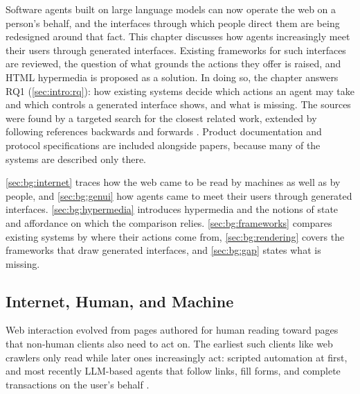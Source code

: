 

Software agents built on large language models can now operate the web on a person's behalf, and the interfaces through which people direct them are being redesigned around that fact.
This chapter discusses how agents increasingly meet their users through generated interfaces.
Existing frameworks for such interfaces are reviewed, the question of what grounds the actions they offer is raised, and HTML hypermedia is proposed as a solution.
In doing so, the chapter answers RQ1 (\autoref{sec:intro:rq}): how existing systems decide which actions an agent may take and which controls a generated interface shows, and what is missing.
The sources were found by a targeted search for the closest related work, extended by following references backwards and forwards \cite{wohlin2014guidelines}.
Product documentation and protocol specifications are included alongside papers, because many of the systems are described only there.

\autoref{sec:bg:internet} traces how the web came to be read by machines as well as by people, and \autoref{sec:bg:genui} how agents came to meet their users through generated interfaces.
\autoref{sec:bg:hypermedia} introduces hypermedia and the notions of state and affordance on which the comparison relies.
\autoref{sec:bg:frameworks} compares existing systems by where their actions come from, \autoref{sec:bg:rendering} covers the frameworks that draw generated interfaces, and \autoref{sec:bg:gap} states what is missing.

\subsection{Internet, Human, and Machine}\label{sec:bg:internet}

Web interaction evolved from pages authored for human reading toward pages that non-human clients also need to act on.
The earliest such clients like web crawlers only read while later ones increasingly act: scripted automation at first, and most recently LLM-based agents that follow links, fill forms, and complete transactions on the user's behalf \cite{mesbah2012crawling, ning2025survey, yang2025agentic}.


